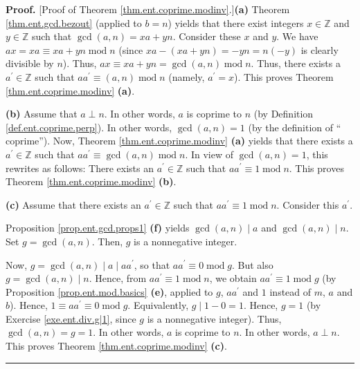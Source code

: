 \documentclass[numbers=enddot,12pt,final,onecolumn,notitlepage]{scrartcl}%
\numberwithin{exer}{subsection}
\theoremstyle{definition}
\newenvironment{proof}[1][Proof]{\noindent\textbf{#1.} }{\ \rule{0.5em}{0.5em}}
\begin{document}
\begin{proof}
[Proof of Theorem \ref{thm.ent.coprime.modinv}.]\textbf{(a)} Theorem
\ref{thm.ent.gcd.bezout} (applied to $b=n$) yields that there exist integers
$x\in\mathbb{Z}$ and $y\in\mathbb{Z}$ such that $\gcd\left(  a,n\right)
=xa+yn$. Consider these $x$ and $y$. We have $ax=xa\equiv
xa+yn\operatorname{mod}n$ (since $xa-\left(  xa+yn\right)  =-yn=n\left(
-y\right)  $ is clearly divisible by $n$). Thus, $ax\equiv xa+yn=\gcd\left(
a,n\right)  \operatorname{mod}n$. Thus, there exists a $a^{\prime}%
\in\mathbb{Z}$ such that $aa^{\prime}\equiv\left(  a,n\right)
\operatorname{mod}n$ (namely, $a^{\prime}=x$). This proves Theorem
\ref{thm.ent.coprime.modinv} \textbf{(a)}.

\textbf{(b)} Assume that $a\perp n$. In other words, $a$ is coprime to $n$ (by
Definition \ref{def.ent.coprime.perp}). In other words, $\gcd\left(
a,n\right)  =1$ (by the definition of \textquotedblleft
coprime\textquotedblright). Now, Theorem \ref{thm.ent.coprime.modinv}
\textbf{(a)} yields that there exists a $a^{\prime}\in\mathbb{Z}$ such that
$aa^{\prime}\equiv\gcd\left(  a,n\right)  \operatorname{mod}n$. In view of
$\gcd\left(  a,n\right)  =1$, this rewrites as follows: There exists an
$a^{\prime}\in\mathbb{Z}$ such that $aa^{\prime}\equiv1\operatorname{mod}n$.
This proves Theorem \ref{thm.ent.coprime.modinv} \textbf{(b)}.

\textbf{(c)} Assume that there exists an $a^{\prime}\in\mathbb{Z}$ such that
$aa^{\prime}\equiv1\operatorname{mod}n$. Consider this $a^{\prime}$.

Proposition \ref{prop.ent.gcd.props1} \textbf{(f)} yields $\gcd\left(
a,n\right)  \mid a$ and $\gcd\left(  a,n\right)  \mid n$. Set $g=\gcd\left(
a,n\right)  $. Then, $g$ is a nonnegative integer.

Now, $g=\gcd\left(  a,n\right)  \mid a\mid aa^{\prime}$, so that $aa^{\prime
}\equiv0\operatorname{mod}g$. But also $g=\gcd\left(  a,n\right)  \mid n$.
Hence, from $aa^{\prime}\equiv1\operatorname{mod}n$, we obtain $aa^{\prime
}\equiv1\operatorname{mod}g$ (by Proposition \ref{prop.ent.mod.basics}
\textbf{(e)}, applied to $g$, $aa^{\prime}$ and $1$ instead of $m$, $a$ and
$b$). Hence, $1\equiv aa^{\prime}\equiv0\operatorname{mod}g$. Equivalently,
$g\mid1-0=1$. Hence, $g=1$ (by Exercise \ref{exe.ent.div.g|1}, since $g$ is a
nonnegative integer). Thus, $\gcd\left(  a,n\right)  =g=1$. In other words,
$a$ is coprime to $n$. In other words, $a\perp n$. This proves Theorem
\ref{thm.ent.coprime.modinv} \textbf{(c)}.
\end{proof}
\end{document}
